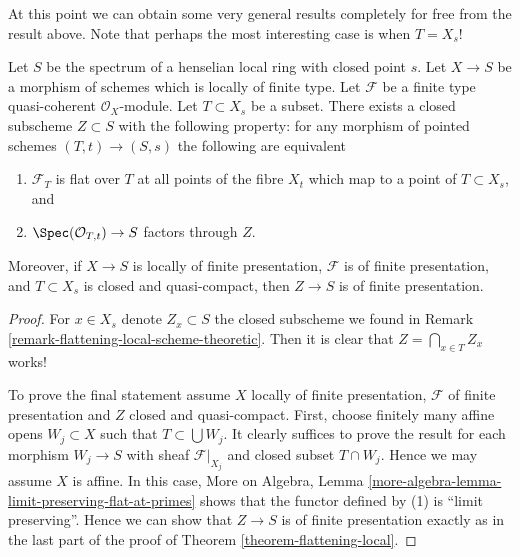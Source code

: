 \noindent
At this point we can obtain some very general results completely
for free from the result above. Note that perhaps the most interesting
case is when $T = X_s$!

\begin{lemma}
\label{lemma-freebie}
Let $S$ be the spectrum of a henselian local ring with closed point $s$.
Let $X \to S$ be a morphism of schemes which is locally of finite type.
Let $\mathcal{F}$ be a finite type quasi-coherent $\mathcal{O}_X$-module.
Let $T \subset X_s$ be a subset. There exists a closed subscheme
$Z \subset S$ with the following property: for any morphism of pointed
schemes $(T, t) \to (S, s)$ the following are equivalent
\begin{enumerate}
\item $\mathcal{F}_T$ is flat over $T$ at all points of the fibre
$X_t$ which map to a point of $T \subset X_s$, and
\item $\Spec(\mathcal{O}_{T, t}) \to S$ factors through $Z$.
\end{enumerate}
Moreover, if $X \to S$ is locally of finite presentation,
$\mathcal{F}$ is of finite presentation, and $T \subset X_s$ is
closed and quasi-compact, then $Z \to S$ is of finite presentation.
\end{lemma}

\begin{proof}
For $x \in X_s$ denote $Z_x \subset S$ the closed subscheme we found in
Remark \ref{remark-flattening-local-scheme-theoretic}.
Then it is clear that $Z = \bigcap_{x \in T} Z_x$ works!

\medskip\noindent
To prove the final statement assume $X$ locally of finite presentation,
$\mathcal{F}$ of finite presentation and $Z$ closed and quasi-compact.
First, choose finitely many affine opens $W_j \subset X$ such that
$T \subset \bigcup W_j$. It clearly suffices to prove the
result for each morphism $W_j \to S$ with sheaf $\mathcal{F}|_{X_j}$
and closed subset $T \cap W_j$. Hence we may assume $X$ is affine.
In this case,
More on Algebra, Lemma \ref{more-algebra-lemma-limit-preserving-flat-at-primes}
shows that the functor defined by (1) is ``limit preserving''.
Hence we can show that $Z \to S$ is of finite presentation exactly
as in the last part of the proof of
Theorem \ref{theorem-flattening-local}.
\end{proof}

